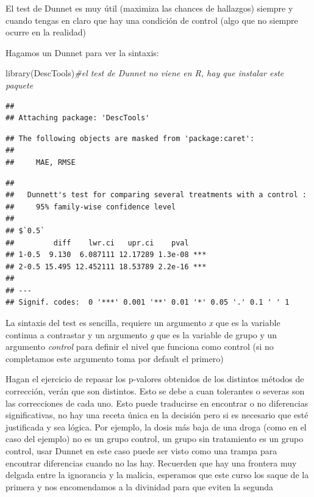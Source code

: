 \documentclass[
]{book}
\newenvironment{Shaded}{\begin{snugshade}}{\end{snugshade}}
\newcommand{\AttributeTok}[1]{\textcolor[rgb]{0.77,0.63,0.00}{#1}}
\newcommand{\CommentTok}[1]{\textcolor[rgb]{0.56,0.35,0.01}{\textit{#1}}}
\newcommand{\FunctionTok}[1]{\textcolor[rgb]{0.00,0.00,0.00}{#1}}
\newcommand{\NormalTok}[1]{#1}
\newcommand{\SpecialCharTok}[1]{\textcolor[rgb]{0.00,0.00,0.00}{#1}}
\newcommand{\StringTok}[1]{\textcolor[rgb]{0.31,0.60,0.02}{#1}}
\begin{document}
El test de Dunnet es muy útil (maximiza las chances de hallazgos) siempre y cuando tengas en claro que hay una condición de control (algo que no siempre ocurre en la realidad)

Hagamos un Dunnet para ver la sintaxis:

\begin{Shaded}
\begin{Highlighting}[]
\FunctionTok{library}\NormalTok{(DescTools)}\CommentTok{\#el test de Dunnet no viene en R, hay que instalar este paquete}
\end{Highlighting}
\end{Shaded}

\begin{verbatim}
## 
## Attaching package: 'DescTools'
\end{verbatim}

\begin{verbatim}
## The following objects are masked from 'package:caret':
## 
##     MAE, RMSE
\end{verbatim}

\begin{Shaded}
\end{Shaded}

\begin{verbatim}
## 
##   Dunnett's test for comparing several treatments with a control :  
##     95% family-wise confidence level
## 
## $`0.5`
##         diff    lwr.ci   upr.ci    pval    
## 1-0.5  9.130  6.087111 12.17289 1.3e-08 ***
## 2-0.5 15.495 12.452111 18.53789 2.2e-16 ***
## 
## ---
## Signif. codes:  0 '***' 0.001 '**' 0.01 '*' 0.05 '.' 0.1 ' ' 1
\end{verbatim}

La sintaxis del test es sencilla, requiere un argumento \emph{x} que es la variable continua a contrastar y un argumento \emph{g} que es la variable de grupo y un argumento \emph{control} para definir el nivel que funciona como control (si no completamos este argumento toma por default el primero)

Hagan el ejercicio de repasar los p-valores obtenidos de los distintos métodos de corrección, verán que son distintos. Esto se debe a cuan tolerantes o severas son las correcciones de cada uno. Esto puede traducirse en encontrar o no diferencias significativas, no hay una receta única en la decisión pero si es necesario que esté justificada y sea lógica. Por ejemplo, la dosis más baja de una droga (como en el caso del ejemplo) no es un grupo control, un grupo sin tratamiento es un grupo control, usar Dunnet en este caso puede ser visto como una trampa para encontrar diferencias cuando no las hay. Recuerden que hay una frontera muy delgada entre la ignorancia y la malicia, esperamos que este curso los saque de la primera y nos encomendamos a la divinidad para que eviten la segunda
\end{document}
